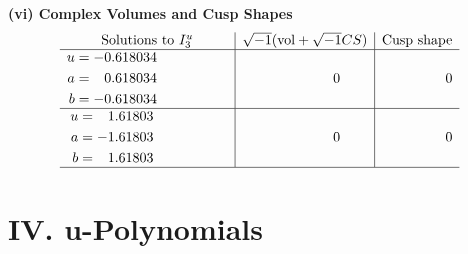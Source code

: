 \documentclass[1p]{elsarticle_modified}
\theoremstyle{definition}
\newcommand{\I}{\sqrt{-1}}
\begin{document}
\newpage\flushleft \textbf{(vi) Complex Volumes and Cusp Shapes}
$$\begin{array}{c|c|c}  
\text{Solutions to }I^u_{3}& \I (\text{vol} + \sqrt{-1}CS) & \text{Cusp shape}\\
 \hline 
\begin{aligned}
u &= -0.618034\phantom{ +0.000000I} \\
a &= \phantom{-}0.618034\phantom{ +0.000000I} \\
b &= -0.618034\phantom{ +0.000000I}\end{aligned}
 & \phantom{-0.000000 } 0 & \phantom{-0.000000 } 0 \\ \hline\begin{aligned}
u &= \phantom{-}1.61803\phantom{ +0.000000I} \\
a &= -1.61803\phantom{ +0.000000I} \\
b &= \phantom{-}1.61803\phantom{ +0.000000I}\end{aligned}
 & \phantom{-0.000000 } 0 & \phantom{-0.000000 } 0\\
 \hline 
 \end{array}$$\newpage
\newpage\renewcommand{\arraystretch}{1}
\centering \section*{ IV. u-Polynomials}
\end{document}
